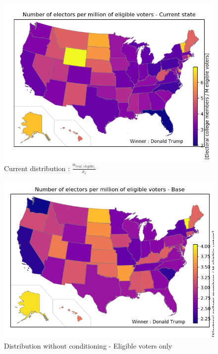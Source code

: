 \documentclass[a4paper,9pt,calibri,oneside,openany, twocolumn]{report}
\theoremstyle{break}
\begin{document}
\begin{figure}[H]
	\centering
	\includegraphics[width=\linewidth]{mapCurrentEligible}
	\caption{Current distribution : $\frac{\alpha_{real,eligible_i}}{x_i}$}
\end{figure}
\begin{figure}[H]
	\centering
	\includegraphics[width=\linewidth]{mapEligibleBase}
	\caption{Distribution without conditioning - Eligible voters only}
\end{figure}
\end{document}
